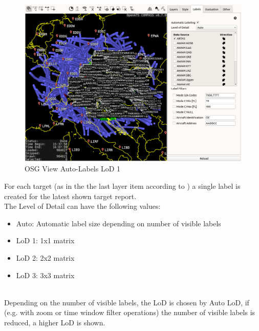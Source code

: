 \begin{figure}[H]
    \hspace*{-2.5cm}
    \includegraphics[width=19cm,frame]{figures/osgview_label_lod1.png}
  \caption{OSG View Auto-Labels LoD 1}
\end{figure}

For each target (as in the the last layer item according to ) a single label is created for the latest shown target report. \\

The Level of Detail can have the following values:
\begin{itemize}
 \item Auto: Automatic label size depending on number of visible labels
 \item LoD 1: 1x1 matrix
 \item LoD 2: 2x2 matrix
 \item LoD 3: 3x3 matrix
\end{itemize} 
\ \\

Depending on the number of visible labels, the LoD is chosen by Auto LoD, if (e.g. with zoom or time window filter operations) the number of visible labels is reduced, a higher LoD is shown.

